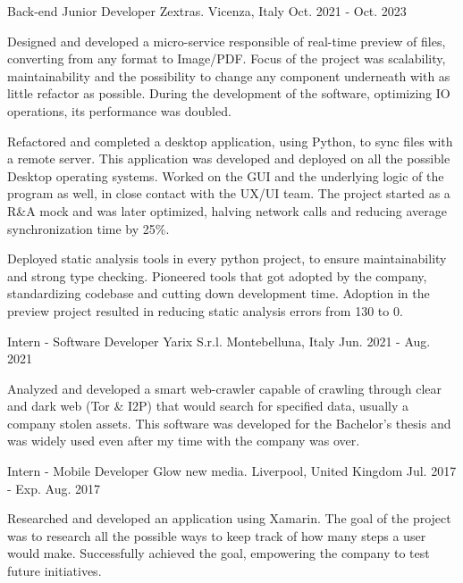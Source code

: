\begin{cventries}
  \cventry
    {Back-end Junior Developer} %
    {Zextras.} %
    {Vicenza, Italy} %
    {Oct. 2021 - Oct. 2023} %
    {
      \begin{cvitems} %
        \item {Designed and developed a micro-service responsible of real-time preview of files, converting from any format to Image/PDF. Focus of the project was scalability, maintainability and the possibility to change any component underneath with as little refactor as possible. During the development of the software, optimizing IO operations, its performance was doubled.}
        \item {Refactored and completed a desktop application, using Python, to sync files with a remote server. This application was developed and deployed on all the possible Desktop operating systems. Worked on the GUI and the underlying logic of the program as well, in close contact with the UX/UI team. The project started as a R\&A mock and was later optimized, halving network calls and reducing average synchronization time by 25\%.}
        \item {Deployed static analysis tools in every python project, to ensure maintainability and strong type checking. Pioneered tools that got adopted by the company, standardizing codebase and cutting down development time. Adoption in the preview project resulted in reducing static analysis errors from 130 to 0.}
      \end{cvitems}
    }

  \cventry
    {Intern - Software Developer} %
    {Yarix S.r.l.} %
    {Montebelluna, Italy} %
    {Jun. 2021 - Aug. 2021} %
    {
      \begin{cvitems} %
        \item {Analyzed and developed a smart web-crawler capable of crawling through clear and dark web (Tor \& I2P) that would search for specified data, usually a company stolen assets. This software was developed for the Bachelor's thesis and was widely used even after my time with the company was over.}
      \end{cvitems}
    }

  \cventry
    {Intern - Mobile Developer} %
    {Glow new media.} %
    {Liverpool, United Kingdom} %
    {Jul. 2017 - Exp. Aug. 2017} %
    {
      \begin{cvitems} %
        \item {Researched and developed an application using Xamarin. The goal of the project was to research all the possible ways to keep track of how many steps a user would make. Successfully achieved the goal, empowering the company to test future initiatives.}
      \end{cvitems}
    }


\end{cventries}
